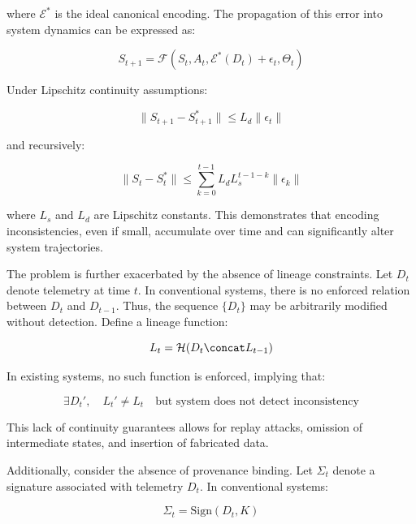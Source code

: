 where $\mathcal{E}^*$ is the ideal canonical encoding. The propagation of this error into system dynamics can be expressed as:

\begin{equation}
S_{t+1} = \mathcal{F}(S_t, A_t, \mathcal{E}^*(D_t) + \epsilon_t, \Theta_t)
\end{equation}

Under Lipschitz continuity assumptions:

\begin{equation}
\|S_{t+1} - S_{t+1}^*\| \leq L_d \|\epsilon_t\|
\end{equation}

and recursively:

\begin{equation}
\|S_t - S_t^*\| \leq \sum_{k=0}^{t-1} L_d L_s^{t-1-k} \|\epsilon_k\|
\end{equation}

where $L_s$ and $L_d$ are Lipschitz constants. This demonstrates that encoding inconsistencies, even if small, accumulate over time and can significantly alter system trajectories.

The problem is further exacerbated by the absence of lineage constraints. Let $D_t$ denote telemetry at time $t$. In conventional systems, there is no enforced relation between $D_t$ and $D_{t-1}$. Thus, the sequence $\{D_t\}$ may be arbitrarily modified without detection. Define a lineage function:

\begin{equation}
L_t = \mathcal{H}(D_t \concat L_{t-1})
\end{equation}

In existing systems, no such function is enforced, implying that:

\begin{equation}
\exists D_t', \quad L_t' \neq L_t \quad \text{but system does not detect inconsistency}
\end{equation}

This lack of continuity guarantees allows for replay attacks, omission of intermediate states, and insertion of fabricated data.

Additionally, consider the absence of provenance binding. Let $\Sigma_t$ denote a signature associated with telemetry $D_t$. In conventional systems:

\begin{equation}
\Sigma_t = \text{Sign}(D_t, K)
\end{equation}

